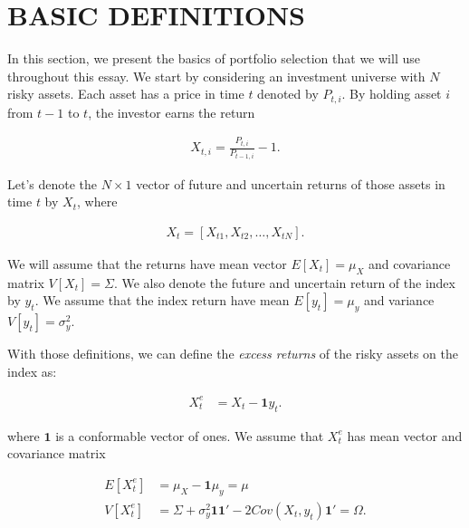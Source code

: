 \documentclass[12pt,oneside,a4paper]{memoir}
\begin{document}
\section{BASIC DEFINITIONS} \label{sec:defs}

In this section, we present the basics of portfolio selection that we will use throughout this essay.
We start by considering an investment universe with $N$ risky assets.
Each asset has a price in time $t$ denoted by $P_{t,i}$.
By holding asset $i$ from $t-1$ to $t$, the investor earns the return

\vspace{-18 pt}
\begin{align} \label{eq:ret}
	X_{t,i} = \frac{P_{t,i}}{P_{t-1,i}} - 1.
\end{align}

Let's  denote the $N\times1$ vector of future and uncertain returns of those assets in time $t$ by $X_{t}$, where 

\vspace{-18 pt}
\begin{align*} %
	X_{t} =  [X_{t1}, X_{t2} , \dots, X_{tN}].
\end{align*}

\noindent
We will assume that the returns have mean vector $E[X_{t}] =\mu_{X}$ and covariance matrix $V[X_{t}] =\Sigma$.
We also denote the future and uncertain return of the index by $y_{t}$.
We assume that the index return have mean $E[y_{t}] = \mu_{y}$ and variance $V[y_{t}]=\sigma^2_{y}$.

With those definitions, we can define the \textit{excess returns} of the risky assets on the index as:

\vspace{-18 pt}
\begin{align*}
	X^{e}_{t} &= X_{t} - \mathbf{1} y_{t}.
\end{align*}

\noindent
where $\mathbf{1}$ is a conformable vector of ones.
We assume that $X^{e}_{t}$ has mean vector and covariance matrix 

\vspace{-18 pt}
\begin{align*}
E[X^{e}_{t}] &= \mu_{X} - \mathbf{1} \mu_{y}=\mu
\\
V[X^{e}_{t}] &=
\Sigma +
\sigma_{y}^{2} \mathbf{1}\mathbf{1}' -
2Cov(X_{t},y_{t})\mathbf{1}' =\Omega.
\end{align*}
\end{document}
